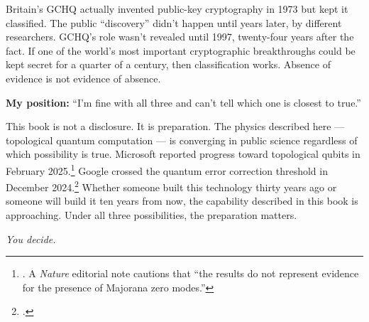\vspace{0.5cm}

Britain's GCHQ actually invented public-key cryptography in 1973 but kept it classified. The public ``discovery'' didn't happen until years later, by different researchers. GCHQ's role wasn't revealed until 1997, twenty-four years after the fact. If one of the world's most important cryptographic breakthroughs could be kept secret for a quarter of a century, then classification works. Absence of evidence is not evidence of absence.

\vspace{0.5cm}

\noindent\textbf{My position:} ``I'm fine with all three and can't tell which one is closest to true.''

This book is not a disclosure. It is preparation. The physics described here --- topological quantum computation --- is converging in public science regardless of which possibility is true. Microsoft reported progress toward topological qubits in February 2025.\footnote{\cite{microsoft2025}. A \textit{Nature} editorial note cautions that ``the results do not represent evidence for the presence of Majorana zero modes.''} Google crossed the quantum error correction threshold in December 2024.\footcite{google2025} Whether someone built this technology thirty years ago or someone will build it ten years from now, the capability described in this book is approaching. Under all three possibilities, the preparation matters.

\vspace{0.5cm}

\begin{center}
\textit{You decide.}
\end{center}

\chapterreturn
